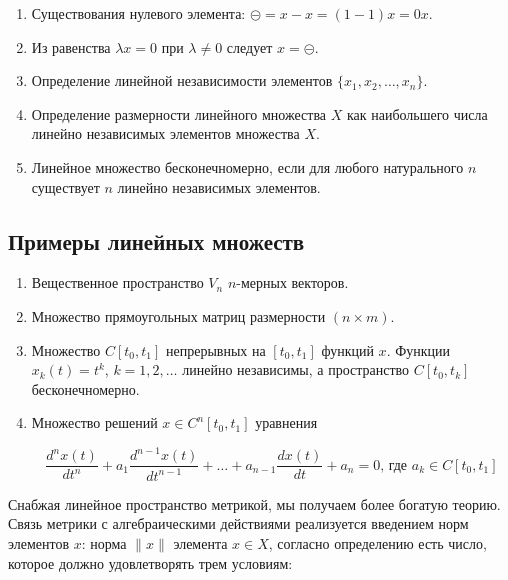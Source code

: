 \documentclass[12pt,a4paper,titlepage,oneside]{book}
\theoremstyle{definition}
\theoremstyle{plain}
\theoremstyle{remark}
\theoremstyle{remark}
\theoremstyle{remark}
\theoremstyle{remark}
\theoremstyle{plain}
\theoremstyle{plain}
\begin{document}
\begin{enumerate}

	\item Существования нулевого элемента: $\circleddash=x-x=(1-1)x=0x$.

	\item Из равенства $\lambda x=0$ при $\lambda\ne0$ следует $x=\circleddash$.

	\item Определение линейной независимости элементов $\{x_1,x_2, \ldots, x_n\}$.

	\item Определение размерности линейного множества $X$ как наибольшего числа линейно независимых элементов множества $X$.

	\item Линейное множество бесконечномерно, если для любого натурального $n$ существует $n$ линейно независимых элементов.

\end{enumerate}

\subsection*{Примеры линейных множеств}

\begin{enumerate}

	\item Вещественное пространство $V_n$ $n$-мерных векторов.

	\item Множество прямоугольных матриц размерности $(n\times m)$.

	\item Множество $C[t_0,t_1]$ непрерывных на $[t_0,t_1]$ функций $x$. Функции $x_k(t)=t^k$, $k=1,2,\ldots$ линейно независимы, а пространство $C[t_0,t_k]$ бесконечномерно.

	\item Множество решений $x\in C^n[t_0,t_1]$ уравнения

	\begin{equation*}
	\frac{d^nx(t)}{dt^n}+a_1\frac{d^{n-1}x(t)}{dt^{n-1}}+\ldots+a_{n-1}\frac{dx(t)}{dt}+a_n=0 \mbox{, где } a_k\in C[t_0,t_1]
	\end{equation*}

\end{enumerate}


Снабжая линейное пространство метрикой, мы получаем более богатую теорию. Связь метрики с алгебраическими действиями реализуется введением норм элементов $x$: норма $\lVert x\rVert$ элемента $x\in X$, согласно определению есть число, которое должно удовлетворять трем условиям:
\end{document}
